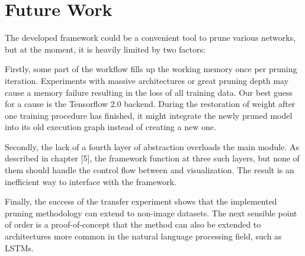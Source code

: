 \section{Future Work}
The developed framework could be a convenient tool to prune various networks, but at the moment, it is heavily limited by two factors:

Firstly, some part of the workflow fills up the working memory once per pruning iteration. Experiments with massive architectures or great pruning depth may cause a memory failure resulting in the loss of all training data. Our best guess for a cause is the Tensorflow 2.0 backend. During the restoration of weight after one training procedure has finished, it might integrate the newly pruned model into its old execution graph instead of creating a new one.

Secondly, the lack of a fourth layer of abstraction overloads the main module. As described in chapter [5], the framework function at three such layers, but none of them should handle the control flow between and visualization. The result is an inefficient way to interface with the framework.

Finally, the success of the transfer experiment shows that the implemented pruning methodology can extend to non-image datasets. The next sensible point of order is a proof-of-concept that the method can also be extended to architectures more common in the natural language processing field, such as LSTMs.

